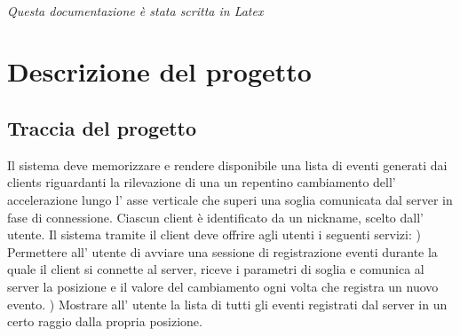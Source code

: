 \documentclass[a4paper,11pt]{report}
\begin{document}
\thispagestyle{empty}
\centering
 \, \\  \, \\ \, \\ \, \\ \, \\ \, \\ \, \\ \, \\ \, \\ \, \\ \, \\ \, \\ \, \\ \, \\ \, \\ \, \\ \, \\ \, \\ \, \\ \, \\ \, \\ \, \\ \, \\ \, \\ \, \\ \, \\ \, \\ \, \\ 
 
 {\huge\emph{Questa documentazione è stata scritta in Latex}}

\clearpage


	\tableofcontents
	\chapter{\Large{\textbf{Descrizione del progetto}}}
\justifying
\vspace{-10mm}
\section{\large{\textbf{Traccia del progetto}}}

Il sistema deve memorizzare e rendere disponibile una lista di eventi generati dai clients riguardanti la rilevazione di una un repentino cambiamento dell' accelerazione lungo l' asse verticale che superi una soglia comunicata dal server in fase di connessione. Ciascun client è identificato da un nickname, scelto dall' utente.
Il sistema tramite il client deve offrire agli utenti i seguenti servizi: ) Permettere all' utente di avviare una sessione di registrazione eventi durante la quale il client si connette al server, riceve i parametri di soglia e comunica al server la posizione e il valore del cambiamento ogni volta che registra un nuovo evento. ) Mostrare all' utente la lista di tutti gli eventi registrati dal server in un certo raggio dalla propria posizione. 
\justifying
\end{document}
